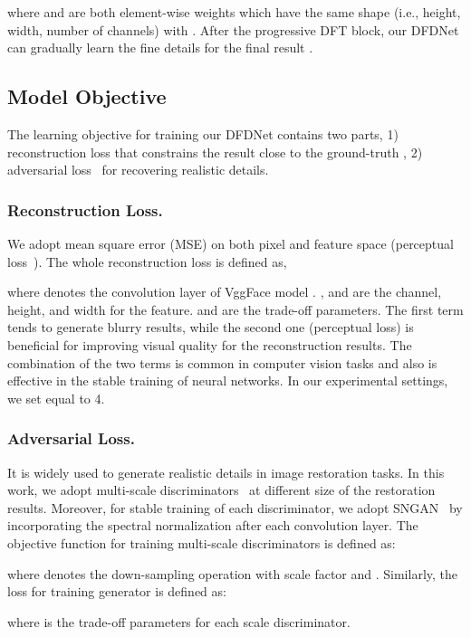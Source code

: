 \documentclass[runningheads]{llncs}
\begin{document}
where  and  are both element-wise weights which have the same shape (i.e., height, width, number of channels) with .
After the progressive DFT block, our DFDNet can gradually learn the fine details for the final result .

\subsection{Model Objective}
The learning objective for training our DFDNet contains two parts, 1) reconstruction loss that constrains the result  close to the ground-truth , 2) adversarial loss~\cite{goodfellow2014generative} for recovering realistic details.

\subsubsection{Reconstruction Loss.} We adopt mean square error (MSE) on both pixel and feature space (perceptual loss~\cite{johnson2016perceptual}). The whole reconstruction loss is defined as,
 
where  denotes the  convolution layer of VggFace model . ,  and  are the channel, height, and width for the  feature.  and  are the trade-off parameters. The first term tends to generate blurry results, while the second one (perceptual loss) is beneficial for improving visual quality for the reconstruction results. The combination of the two terms is common in computer vision tasks and also is effective in the stable training of neural networks. In our experimental settings, we set  equal to 4.

\subsubsection{Adversarial Loss.} It is widely used to generate realistic details in image restoration tasks. In this work, we adopt multi-scale discriminators~\cite{wang2018pix2pixHD} at different size of the restoration results. Moreover, for stable training of each discriminator, we adopt SNGAN~\cite{miyato2018spectral} by incorporating the spectral normalization after each convolution layer. The objective function for training multi-scale discriminators is defined as:

where  denotes the down-sampling operation with scale factor  and . Similarly, the loss for training generator  is defined as:

where  is the trade-off parameters for each scale discriminator. 
\end{document}
